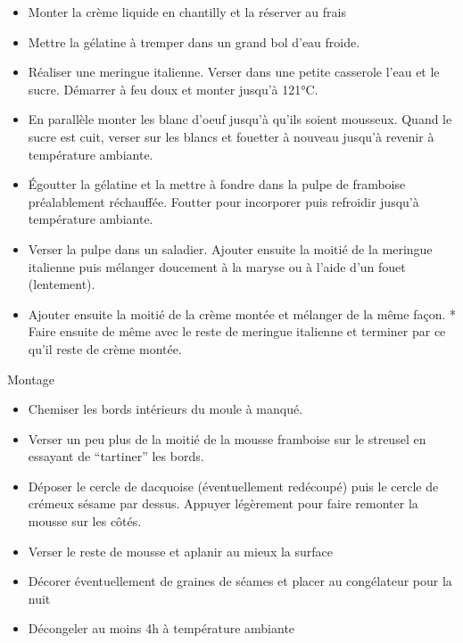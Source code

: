\documentclass[]{book}
\providecommand{\tightlist}{%
  \setlength{\itemsep}{0pt}\setlength{\parskip}{0pt}}
\begin{document}
\begin{itemize}
\tightlist
\item
  Monter la crème liquide en chantilly et la réserver au frais
\item
  Mettre la gélatine à tremper dans un grand bol d'eau froide.
\item
  Réaliser une meringue italienne. Verser dans une petite casserole
  l'eau et le sucre. Démarrer à feu doux et monter jusqu'à 121°C.
\item
  En parallèle monter les blanc d'oeuf jusqu'à qu'ils soient mousseux.
  Quand le sucre est cuit, verser sur les blancs et fouetter à nouveau
  jusqu'à revenir à température ambiante.
\item
  Égoutter la gélatine et la mettre à fondre dans la pulpe de framboise
  préalablement réchauffée. Foutter pour incorporer puis refroidir
  jusqu'à température ambiante.
\item
  Verser la pulpe dans un saladier. Ajouter ensuite la moitié de la
  meringue italienne puis mélanger doucement à la maryse ou à l'aide
  d'un fouet (lentement).
\item
  Ajouter ensuite la moitié de la crème montée et mélanger de la même
  façon. * Faire ensuite de même avec le reste de meringue italienne et
  terminer par ce qu'il reste de crème montée.
\end{itemize}

Montage

\begin{itemize}
\tightlist
\item
  Chemiser les bords intérieurs du moule à manqué.
\item
  Verser un peu plus de la moitié de la mousse framboise sur le streusel
  en essayant de ``tartiner'' les bords.
\item
  Déposer le cercle de dacquoise (éventuellement redécoupé) puis le
  cercle de crémeux sésame par dessus. Appuyer légèrement pour faire
  remonter la mousse sur les côtés.
\item
  Verser le reste de mousse et aplanir au mieux la surface
\item
  Décorer éventuellement de graines de séames et placer au congélateur
  pour la nuit
\item
  Décongeler au moins 4h à température ambiante
\end{itemize}
\end{document}

